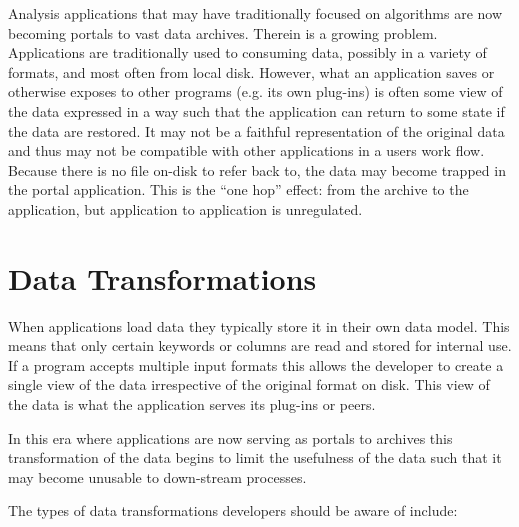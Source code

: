 Analysis applications that may have traditionally focused on 
algorithms are now becoming portals to vast data archives.  Therein is a
growing problem.  Applications are traditionally used to consuming data, 
possibly in a variety of formats, and most often from local disk.  However, 
what an application saves or otherwise exposes to other programs (e.g. its own
plug-ins) is often some view of the data expressed in a way such that the
application can return to some state if the data are restored.  It may not be
a faithful representation of the original data and thus may not be 
compatible with other applications in a users work flow.  Because there
is no file on-disk to refer back to, the data may become trapped in the
portal application.  This is the ``one hop'' effect:  from the archive
to the application, but application to application is unregulated.


\section{Data Transformations}

When applications load data they typically store it in their own data model.
This means that only certain keywords or columns are read and stored for
internal use.  If a program accepts multiple input formats this allows the
developer to create a single view of the data irrespective of the
original format on disk.  This view of the data is what the application
serves its plug-ins or peers.

In this era where applications are now serving as portals to archives this 
transformation of the data begins to limit the usefulness of the data such
that it may become unusable to down-stream processes.

The types of data transformations developers should be aware of include:

